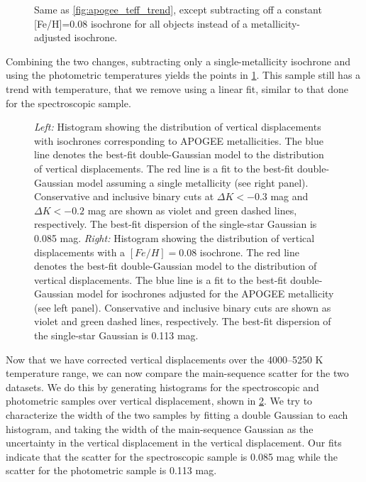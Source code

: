 \documentclass[manuscript]{aastex6}
\begin{document}
\begin{figure}[htb]
    \centering
    \caption{Same as \cref{fig:apogee_teff_trend}, except subtracting off a
    constant [Fe/H]=0.08 isochrone for all objects instead of a 
    metallicity-adjusted isochrone.}\label{fig:photuncor}
\end{figure}

Combining the two changes, subtracting only a single-metallicity isochrone and
using the photometric temperatures yields the points in \cref{fig:photuncor}.
This sample still has a trend with temperature, that we remove using a linear
fit, similar to that done for the spectroscopic sample.

\begin{figure}[htb]
    \centering
    \caption{\emph{Left:} Histogram showing the distribution of vertical 
        displacements with isochrones corresponding to APOGEE metallicities.
        The blue line denotes the best-fit double-Gaussian model to the
        distribution of vertical displacements. The red line is a fit to the
        best-fit double-Gaussian model assuming a single metallicity (see right
        panel). Conservative and inclusive binary cuts at \(\Delta K < -0.3\)
        mag and \(\Delta K < -0.2\) mag are shown as violet and green dashed 
        lines, respectively. The best-fit dispersion of the single-star 
        Gaussian is 0.085 mag. \emph{Right:} Histogram showing the 
        distribution of vertical displacements with a \([Fe/H] = 0.08\) 
        isochrone. The red line denotes the best-fit double-Gaussian model to
        the distribution of vertical displacements. The blue line is a fit to
        the best-fit double-Gaussian model for isochrones adjusted for the
        APOGEE metallicity (see left panel). Conservative and inclusive binary
        cuts are shown as violet and green dashed lines, respectively. The
        best-fit dispersion of the single-star Gaussian is 0.113 
    mag.}\label{fig:histcompare}
\end{figure}

Now that we have corrected vertical displacements over the 4000--5250 K
temperature range, we can now compare the main-sequence scatter for the two
datasets. We do this by generating histograms for the spectroscopic and
photometric samples over vertical displacement, shown in
\cref{fig:histcompare}. We try to characterize the width of the two samples by
fitting a double Gaussian to each histogram, and taking the width of the
main-sequence Gaussian as the uncertainty in the vertical displacement in the
vertical displacement. Our fits indicate that the scatter for the spectroscopic
sample is 0.085 mag while the scatter for the photometric sample is 0.113 mag.
\end{document}
